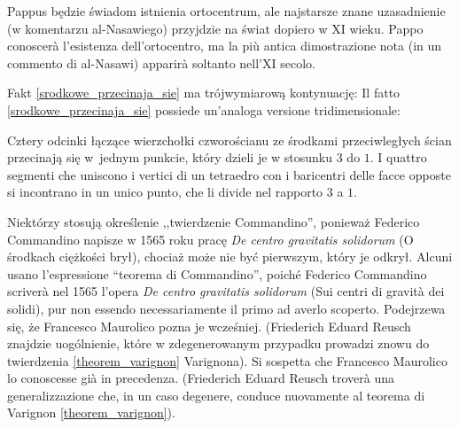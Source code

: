 Pappus będzie świadom istnienia ortocentrum, ale najstarsze znane uzasadnienie (w komentarzu al-Nasawiego) przyjdzie na świat dopiero w XI wieku. %
Pappo conoscerà l'esistenza dell'ortocentro, ma la più antica dimostrazione nota (in un commento di al-Nasawi) apparirà soltanto nell'XI secolo. %
%

Fakt \ref{srodkowe_przecinaja_sie} ma trójwymiarową kontynuację: %
Il fatto \ref{srodkowe_przecinaja_sie} possiede un'analoga versione tridimensionale: %

\begin{proposition}
    Cztery odcinki łączące wierzchołki czworościanu ze środkami przeciwległych ścian przecinają się w~jednym punkcie, który dzieli je w stosunku $3$ do $1$. %
    I quattro segmenti che uniscono i vertici di un tetraedro con i baricentri delle facce opposte si incontrano in un unico punto, che li divide nel rapporto $3$ a $1$. %
\end{proposition}

Niektórzy stosują określenie ,,twierdzenie Commandino'', ponieważ Federico Commandino napisze w 1565 roku pracę \emph{De centro gravitatis solidorum} (O środkach ciężkości brył), chociaż może nie być pierwszym, który je odkrył. %
Alcuni usano l'espressione ``teorema di Commandino'', poiché Federico Commandino scriverà nel 1565 l'opera \emph{De centro gravitatis solidorum} (Sui centri di gravità dei solidi), pur non essendo necessariamente il primo ad averlo scoperto. %
%
Podejrzewa się, że Francesco Maurolico pozna je wcześniej. %
(Friederich Eduard Reusch znajdzie uogólnienie, które w zdegenerowanym przypadku prowadzi znowu do twierdzenia \ref{theorem_varignon} Varignona). %
Si sospetta che Francesco Maurolico lo conoscesse già in precedenza. %
(Friederich Eduard Reusch troverà una generalizzazione che, in un caso degenere, conduce nuovamente al teorema di Varignon \ref{theorem_varignon}). %
%

%